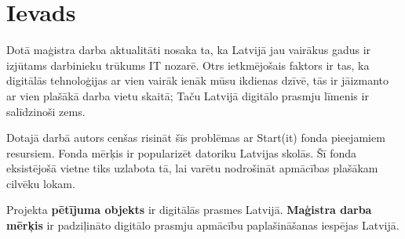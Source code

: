 \chapter*{Ievads} %
Dotā maģistra darba aktualitāti nosaka ta, ka Latvijā jau vairākus gadus ir izjūtams darbinieku 
trūkums IT nozarē. Otrs ietkmējošais faktors ir tas, ka digitālās tehnoloģijas ar vien vairāk
ienāk mūsu ikdienas dzīvē, tās ir jāizmanto ar vien plašākā darba vietu skaitā; Taču Latvijā
digitālo prasmju līmenis ir salīdzinoši zems. 
\par
Dotajā darbā autors cenšas risināt šīs problēmas ar Start(it) fonda pieejamiem resursiem. Fonda mērķis
ir popularizēt datoriku Latvijas skolās. Šī fonda eksistējošā vietne tiks uzlabota tā, lai varētu 
nodrošināt apmācības plašākam cilvēku lokam.
\par
Projekta \textbf{pētījuma objekts} ir digitālās prasmes Latvijā.
\textbf{Maģistra darba mērķis} ir padziļināto digitālo prasmju apmācību paplašināšanas iespējas Latvijā.

